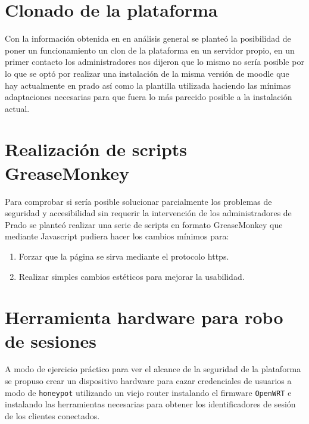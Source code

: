 \section{Clonado de la plataforma}

Con la información obtenida en en análisis general se planteó la posibilidad de poner un funcionamiento un clon de la plataforma en un servidor propio, en un primer contacto los administradores nos dijeron que lo mismo no sería posible por lo que se optó por realizar una instalación de la misma versión de moodle que hay actualmente en prado así como la plantilla utilizada haciendo las mínimas adaptaciones necesarias para que fuera lo más parecido posible a la instalación actual.

\section{Realización de scripts GreaseMonkey}

Para comprobar si sería posible solucionar parcialmente los problemas de seguridad y accesibilidad sin requerir la intervención de los administradores de Prado se planteó realizar una serie de scripts en formato GreaseMonkey que mediante Javascript pudiera hacer los cambios mínimos para:

  		\begin{enumerate}
  			\item Forzar que la página se sirva mediante el protocolo https.
            \item Realizar simples cambios estéticos para mejorar la usabilidad.
        \end{enumerate}

\section{Herramienta hardware para robo de sesiones}

A modo de ejercicio práctico para ver el alcance de la seguridad de la plataforma se propuso crear un dispositivo hardware para cazar credenciales de usuarios a modo de \texttt{honeypot} utilizando un viejo router instalando el firmware \texttt{OpenWRT} \cite{openwrt} e instalando las herramientas necesarias para obtener los identificadores de sesión de los clientes conectados.



